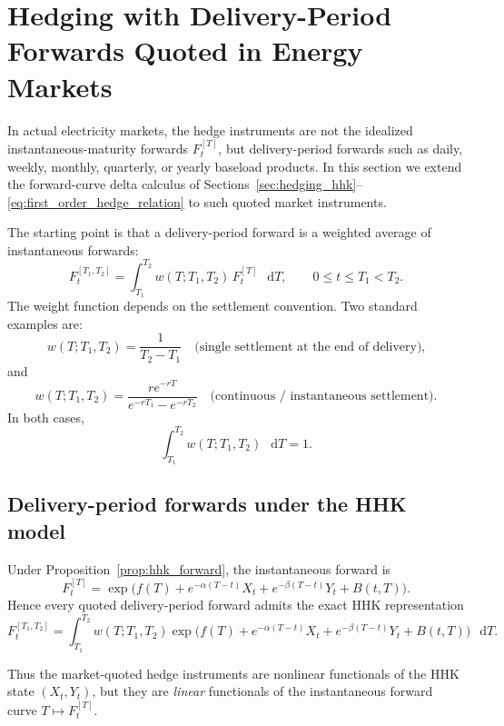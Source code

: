 \documentclass[10pt,a4paper,reqno]{amsart}
\newcommand{\<}{\langle}
\renewcommand{\>}{\rangle}
\theoremstyle{example}
\newcommand*\D{\mathop{}\!\mathrm{d}}
\begin{document}
\section{Hedging with Delivery-Period Forwards Quoted in Energy Markets}
\label{sec:delivery_period_hedging}

In actual electricity markets, the hedge instruments are not the idealized instantaneous-maturity forwards
$F_t^{[T]}$, but delivery-period forwards such as daily, weekly, monthly, quarterly, or yearly baseload
products. In this section we extend the forward-curve delta calculus of
Sections~\ref{sec:hedging_hhk}--\ref{eq:first_order_hedge_relation} to such quoted market instruments.

The starting point is that a delivery-period forward is a weighted average of instantaneous forwards:
\begin{equation}
\label{eq:delivery_forward_def}
F_t^{[T_1,T_2]}
=
\int_{T_1}^{T_2}
w(T;T_1,T_2)\,F_t^{[T]}\,\D T,
\qquad 0\le t\le T_1<T_2.
\end{equation}
The weight function depends on the settlement convention. Two standard examples are:
\begin{equation}
\label{eq:delivery_weights}
w(T;T_1,T_2)
=
\frac{1}{T_2-T_1}
\quad\text{(single settlement at the end of delivery),}
\end{equation}
and
\begin{equation}
\label{eq:delivery_weights_discounted}
w(T;T_1,T_2)
=
\frac{r e^{-rT}}{e^{-rT_1}-e^{-rT_2}}
\quad\text{(continuous / instantaneous settlement).}
\end{equation}
In both cases,
\[
\int_{T_1}^{T_2} w(T;T_1,T_2)\,\D T = 1.
\]

\subsection{Delivery-period forwards under the HHK model}

Under Proposition~\ref{prop:hhk_forward}, the instantaneous forward is
\[
F_t^{[T]}
=
\exp\!\Big(
f(T)
+
e^{-\alpha(T-t)}X_t
+
e^{-\beta(T-t)}Y_t
+
B(t,T)
\Big).
\]
Hence every quoted delivery-period forward admits the exact HHK representation
\begin{equation}
\label{eq:delivery_forward_hhk}
F_t^{[T_1,T_2]}
=
\int_{T_1}^{T_2}
w(T;T_1,T_2)
\exp\!\Big(
f(T)
+
e^{-\alpha(T-t)}X_t
+
e^{-\beta(T-t)}Y_t
+
B(t,T)
\Big)\,\D T.
\end{equation}

Thus the market-quoted hedge instruments are nonlinear functionals of the HHK state $(X_t,Y_t)$, but
they are \emph{linear} functionals of the instantaneous forward curve $T \mapsto F_t^{[T]}$.
\end{document}
